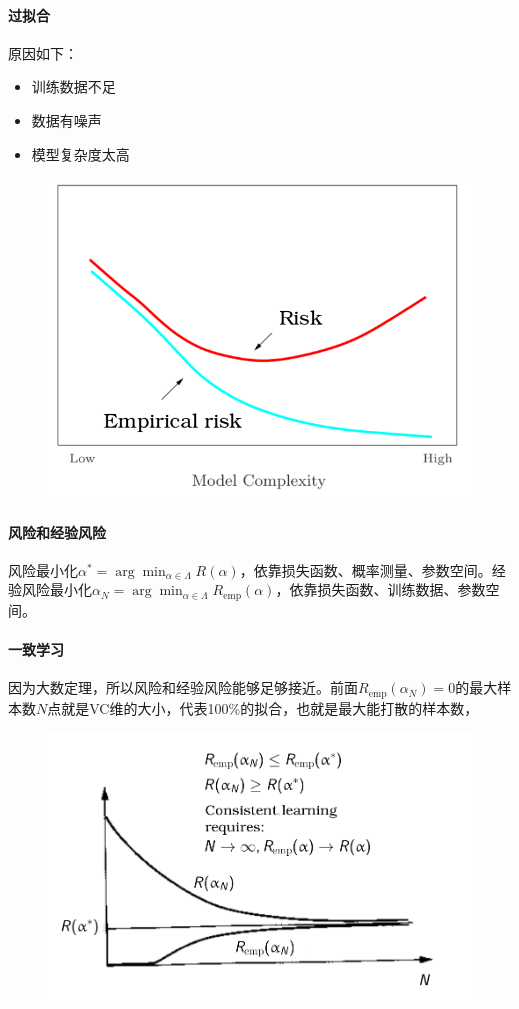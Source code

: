 \paragraph{过拟合} 原因如下：
\begin{itemize}
    \item 训练数据不足
    \item 数据有噪声
    \item 模型复杂度太高
\end{itemize}

\begin{figure}[H]
    \centering
\includegraphics[width=0.3\columnwidth]{sl/2.png}
\end{figure}

\paragraph{风险和经验风险}
风险最小化$\alpha^*=\arg\min_{\alpha \in \Lambda} R(\alpha)$，依靠损失函数、概率测量、参数空间。经验风险最小化$\alpha_N=\arg\min_{\alpha \in \Lambda} R_\text{emp}(\alpha)$，依靠损失函数、训练数据、参数空间。

\paragraph{一致学习} 因为大数定理，所以风险和经验风险能够足够接近。前面$R_\text{emp}(\alpha_N) = 0$的最大样本数$N$点就是VC维的大小，代表100\%的拟合，也就是最大能打散的样本数，
\begin{figure}[H]
    \centering
\includegraphics[width=0.7\columnwidth]{sl/3.png}
\end{figure}


